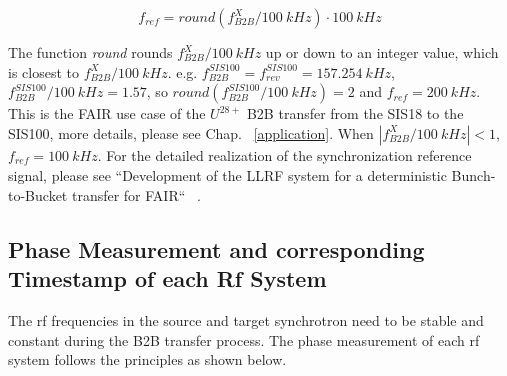 \begin{equation}
\label{round}
	f_\mathit{ref}=\textit{round} (f_\mathit{B2B}^{X}/\SI{100}{kHz})\cdot \SI{100}{kHz}
\end{equation}

The function \textit{round} rounds $f_\mathit{B2B}^{X}/\SI{100}{kHz}$ up or down to an integer value, which is closest to $f_\mathit{B2B}^{X}/\SI{100}{kHz}$. e.g. $f_\mathit{B2B}^{SIS100}=f_\mathit{rev}^{SIS100}=\SI{157.254}{kHz}$, $f_\mathit{B2B}^{SIS100}/\SI{100}{kHz}=1.57$, so $\textit{round} (f_\mathit{B2B}^{SIS100}/\SI{100}{kHz})=2$ and $f_\mathit{ref}=\SI{200}{kHz}$. This is the FAIR use case of the $U^{28+}$ B2B transfer from the SIS18 to the SIS100, more details, please see Chap. ~\ref{application}. When $|f_\mathit{B2B}^{X}/\SI{100}{kHz}|<1$, $f_\mathit{ref}=\SI{100}{kHz}$.  For the detailed realization of the synchronization reference signal, please see ``Development of the LLRF system for a deterministic Bunch-to-Bucket transfer for FAIR`` ~\cite{ferrand_development_????}.

 
%
\subsection{Phase Measurement and corresponding Timestamp of each Rf System}
The rf frequencies in the source and target synchrotron need to be stable and constant during the B2B transfer process. The phase measurement of each rf system follows the principles as shown below.

